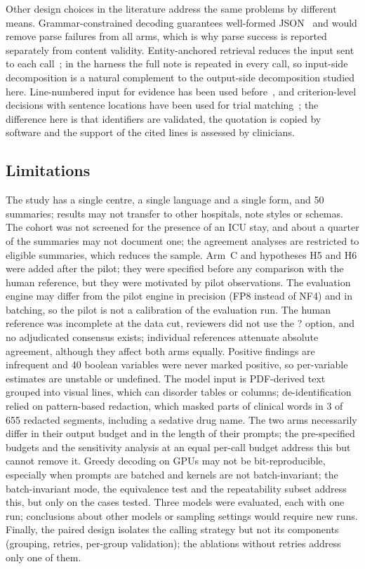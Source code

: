 Other design choices in the literature address the same problems by different means. Grammar-constrained
decoding guarantees well-formed JSON~\cite{privacy2024structured} and would remove parse failures from all
arms, which is why parse success is reported separately from content validity. Entity-anchored retrieval
reduces the input sent to each call~\cite{clinicalentityretrieval2024}; in the harness the full note is repeated
in every call, so input-side decomposition is a natural complement to the output-side decomposition studied
here. Line-numbered input for evidence has been used before~\cite{fornasiere2024medical}, and criterion-level
decisions with sentence locations have been used for trial matching~\cite{trialgpt2024}; the difference here is
that identifiers are validated, the quotation is copied by software and the support of the cited lines is
assessed by clinicians.

\subsection{Limitations}

The study has a single centre, a single language and a single form, and 50 summaries; results may not
transfer to other hospitals, note styles or schemas. The cohort was not screened for the presence of an ICU
stay, and about a quarter of the summaries may not document one; the agreement analyses are restricted to
eligible summaries, which reduces the sample. Arm~C and hypotheses H5 and H6 were added after the pilot; they
were specified before any comparison with the human reference, but they were motivated by pilot observations.
The evaluation engine may differ from the pilot engine in precision (FP8 instead of NF4) and in batching, so the
pilot is not a calibration of the evaluation run. The human reference was incomplete at the data cut,
reviewers did not use the ? option, and no adjudicated consensus exists; individual references attenuate
absolute agreement, although they affect both arms equally. Positive findings are infrequent and 40
boolean variables were never marked positive, so per-variable estimates are unstable or undefined. The
model input is PDF-derived text grouped into visual lines, which can disorder tables or columns;
de-identification relied on pattern-based redaction, which masked parts of clinical words in 3 of 655
redacted segments, including a sedative drug name. The two arms necessarily differ in their output budget
and in the length of their prompts; the pre-specified budgets and the sensitivity analysis at an equal
per-call budget address this but cannot remove it. Greedy decoding on GPUs may not be bit-reproducible,
especially when prompts are batched and kernels are not batch-invariant; the batch-invariant mode, the
equivalence test and the repeatability subset address this, but only on the cases tested. Three models were evaluated, each with one run; conclusions about other models or sampling
settings would require new runs. Finally, the paired design isolates the calling strategy but not its
components (grouping, retries, per-group validation); the ablations without retries address only one of
them.

